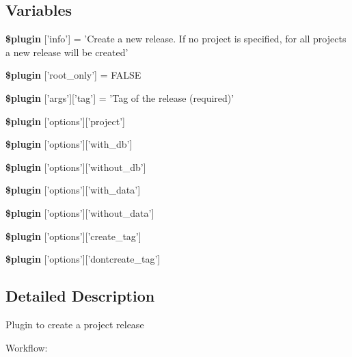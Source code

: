 \subsection*{Variables}
\begin{DoxyCompactItemize}
\item 
\hypertarget{plugin__release-create_8class_8php_a95edf69ebbeaeedb03bab3bb010f2af9}{
{\bfseries \$plugin} \mbox{[}'info'\mbox{]} = 'Create a new release. If no project is specified, for all projects a new release will be created'}
\label{plugin__release-create_8class_8php_a95edf69ebbeaeedb03bab3bb010f2af9}

\item 
\hypertarget{plugin__release-create_8class_8php_a1d302084fa15e3efe6c843cbb5096985}{
{\bfseries \$plugin} \mbox{[}'root\_\-only'\mbox{]} = FALSE}
\label{plugin__release-create_8class_8php_a1d302084fa15e3efe6c843cbb5096985}

\item 
\hypertarget{plugin__release-create_8class_8php_a071be2cb4fe04c66796046a8ed9e6491}{
{\bfseries \$plugin} \mbox{[}'args'\mbox{]}\mbox{[}'tag'\mbox{]} = 'Tag of the release (required)'}
\label{plugin__release-create_8class_8php_a071be2cb4fe04c66796046a8ed9e6491}

\item 
{\bfseries \$plugin} \mbox{[}'options'\mbox{]}\mbox{[}'project'\mbox{]}
\item 
{\bfseries \$plugin} \mbox{[}'options'\mbox{]}\mbox{[}'with\_\-db'\mbox{]}
\item 
{\bfseries \$plugin} \mbox{[}'options'\mbox{]}\mbox{[}'without\_\-db'\mbox{]}
\item 
{\bfseries \$plugin} \mbox{[}'options'\mbox{]}\mbox{[}'with\_\-data'\mbox{]}
\item 
{\bfseries \$plugin} \mbox{[}'options'\mbox{]}\mbox{[}'without\_\-data'\mbox{]}
\item 
{\bfseries \$plugin} \mbox{[}'options'\mbox{]}\mbox{[}'create\_\-tag'\mbox{]}
\item 
{\bfseries \$plugin} \mbox{[}'options'\mbox{]}\mbox{[}'dontcreate\_\-tag'\mbox{]}
\end{DoxyCompactItemize}


\subsection{Detailed Description}
Plugin to create a project release

Workflow:


